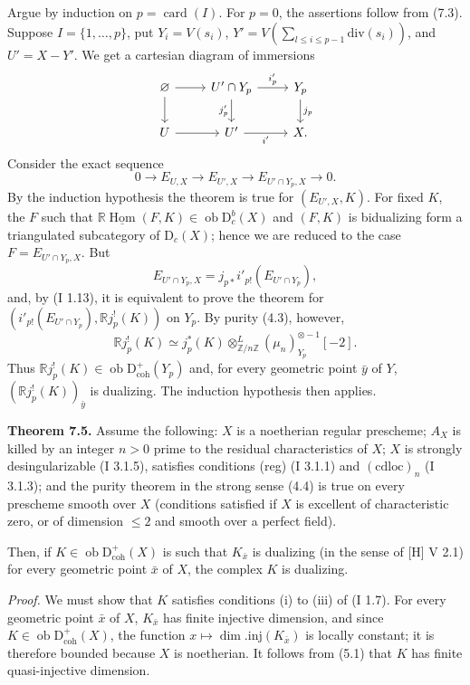 \documentclass[11pt]{article}
\DeclareMathOperator{\Hom}{Hom}
\newcommand{\D}{\mathrm{D}}
\newcommand{\Z}{\mathbb{Z}}
\newcommand{\ob}{\operatorname{ob}}
\providecommand{\Hom}{\operatorname{Hom}}
\providecommand{\ob}{\operatorname{ob}}
\providecommand{\Z}{\mathbb Z}
\providecommand{\Hom}{\operatorname{Hom}}
\begin{document}
Argue by induction on $p=\operatorname{card}(I)$. For $p=0$, the assertions follow from (7.3). Suppose $I=\{1,\ldots,p\}$, put $Y_i=V(s_i)$, $Y'=V(\sum_{l\leq i\leq p-1}\mathrm{div}(s_i))$, and $U'=X-Y'$. We get a cartesian diagram of immersions
\[
\begin{tikzcd}
\varnothing \arrow[r] \arrow[d] & U'\cap Y_p \arrow[r,"i'_p"] \arrow[d,"j'_p"'] & Y_p \arrow[d,"j_p"]\\
U \arrow[r] & U' \arrow[r,"i'"'] & X.
\end{tikzcd}
\]
Consider the exact sequence
\[
        0\longrightarrow E_{U,X}\longrightarrow E_{U',X}\longrightarrow E_{U'\cap Y_p,X}\longrightarrow0.
\]
By the induction hypothesis the theorem is true for $(E_{U',X},K)$. For fixed $K$, the $F$ such that $\mathbb{R}\underline{\Hom}(F,K)\in\ob\D_c^b(X)$ and $(F,K)$ is bidualizing form a triangulated subcategory of $\D_c(X)$; hence we are reduced to the case $F=E_{U'\cap Y_p,X}$. But
\[
        E_{U'\cap Y_p,X}=j_{p*}i'_{p!}(E_{U'\cap Y_p}),
\]
and, by (I 1.13), it is equivalent to prove the theorem for $(i'_{p!}(E_{U'\cap Y_p}),\mathbb{R} j_p^!(K))$ on $Y_p$. By purity (4.3), however,
\[
        \mathbb{R} j_p^!(K)\simeq j_p^*(K)\otimes^L_{\Z/n\Z}(\mu_n)_{Y_p}^{\otimes -1}[-2].
\]
Thus $\mathbb{R} j_p^!(K)\in\ob\D^{+}_{\mathrm{coh}}(Y_p)$ and, for every geometric point $\bar{y}$ of $Y$, $(\mathbb{R} j_p^!(K))_{\bar{y}}$ is dualizing. The induction hypothesis then applies.

\textbf{Theorem 7.5.} Assume the following: $X$ is a noetherian regular prescheme; $A_X$ is killed by an integer $n>0$ prime to the residual characteristics of $X$; $X$ is strongly desingularizable (I 3.1.5), satisfies conditions (reg) (I 3.1.1) and $(\mathrm{cdloc})_n$ (I 3.1.3); and the purity theorem in the strong sense (4.4) is true on every prescheme smooth over $X$ (conditions satisfied if $X$ is excellent of characteristic zero, or of dimension $\leq2$ and smooth over a perfect field).

Then, if $K\in\ob\D^{+}_{\mathrm{coh}}(X)$ is such that $K_{\bar{x}}$ is dualizing (in the sense of [H] V 2.1) for every geometric point $\bar{x}$ of $X$, the complex $K$ is dualizing.

\emph{Proof.} We must show that $K$ satisfies conditions (i) to (iii) of (I 1.7). For every geometric point $\bar{x}$ of $X$, $K_{\bar{x}}$ has finite injective dimension, and since $K\in\ob\D^{+}_{\mathrm{coh}}(X)$, the function $x\mapsto\dim.\mathrm{inj}(K_{\bar{x}})$ is locally constant; it is therefore bounded because $X$ is noetherian. It follows from (5.1) that $K$ has finite quasi-injective dimension.
\end{document}
